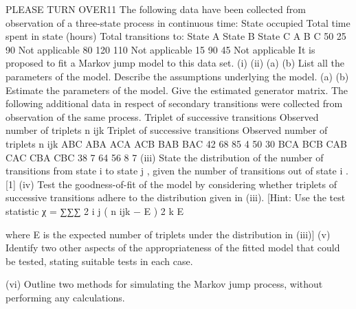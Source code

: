 \documentclass[a4paper,12pt]{article}
\begin{document}
\begin{enumerate}
PLEASE TURN OVER11
The following data have been collected from observation of a three-state process in
continuous time:
State
occupied Total time
spent in state
(hours)
Total transitions to:
State A State B State C
A
B
C 50
25
90 Not applicable
80
120 110
Not applicable
15 90
45
Not applicable
It is proposed to fit a Markov jump model to this data set.
(i)
(ii)
(a)
(b) List all the parameters of the model.
Describe the assumptions underlying the model. 
(a)
(b) Estimate the parameters of the model.
Give the estimated generator matrix. 
The following additional data in respect of secondary transitions were collected from
observation of the same process.
Triplet of
successive
transitions Observed
number of
triplets
n ijk Triplet of
successive
transitions Observed
number of
triplets
n ijk
ABC
ABA
ACA
ACB
BAB
BAC 42
68
85
4
50
30 BCA
BCB
CAB
CAC
CBA
CBC 38
7
64
56
8
7
(iii) State the distribution of the number of transitions from state i to state j , given
the number of transitions out of state i .
[1]
(iv) Test the goodness-of-fit of the model by considering whether triplets of
successive transitions adhere to the distribution given in (iii).
[Hint: Use the test statistic χ = ∑∑∑
2
i
j
( n ijk − E ) 2
k
E

where E is the expected
number of triplets under the distribution in (iii)]
(v) Identify two other aspects of the appropriateness of the fitted model that could
be tested, stating suitable tests in each case.

(vi) Outline two methods for simulating the Markov jump process, without
performing any calculations.












\end{enumerate}
\end{document}
